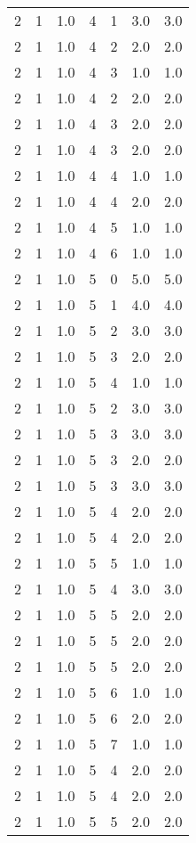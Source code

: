 \documentclass[a4paper,12pt]{article}
\begin{document}
\begin{center}
\begin{longtable}{ c c c | c c c | c }
        2 & 1 & 1.0 & 4 & 1 & 3.0 & 3.0 \\
        2 & 1 & 1.0 & 4 & 2 & 2.0 & 2.0 \\
        2 & 1 & 1.0 & 4 & 3 & 1.0 & 1.0 \\
        2 & 1 & 1.0 & 4 & 2 & 2.0 & 2.0 \\
        2 & 1 & 1.0 & 4 & 3 & 2.0 & 2.0 \\
        2 & 1 & 1.0 & 4 & 3 & 2.0 & 2.0 \\
        2 & 1 & 1.0 & 4 & 4 & 1.0 & 1.0 \\
        2 & 1 & 1.0 & 4 & 4 & 2.0 & 2.0 \\
        2 & 1 & 1.0 & 4 & 5 & 1.0 & 1.0 \\
        2 & 1 & 1.0 & 4 & 6 & 1.0 & 1.0 \\
        2 & 1 & 1.0 & 5 & 0 & 5.0 & 5.0 \\
        2 & 1 & 1.0 & 5 & 1 & 4.0 & 4.0 \\
        2 & 1 & 1.0 & 5 & 2 & 3.0 & 3.0 \\
        2 & 1 & 1.0 & 5 & 3 & 2.0 & 2.0 \\
        2 & 1 & 1.0 & 5 & 4 & 1.0 & 1.0 \\
        2 & 1 & 1.0 & 5 & 2 & 3.0 & 3.0 \\
        2 & 1 & 1.0 & 5 & 3 & 3.0 & 3.0 \\
        2 & 1 & 1.0 & 5 & 3 & 2.0 & 2.0 \\
        2 & 1 & 1.0 & 5 & 3 & 3.0 & 3.0 \\
        2 & 1 & 1.0 & 5 & 4 & 2.0 & 2.0 \\
        2 & 1 & 1.0 & 5 & 4 & 2.0 & 2.0 \\
        2 & 1 & 1.0 & 5 & 5 & 1.0 & 1.0 \\
        2 & 1 & 1.0 & 5 & 4 & 3.0 & 3.0 \\
        2 & 1 & 1.0 & 5 & 5 & 2.0 & 2.0 \\
        2 & 1 & 1.0 & 5 & 5 & 2.0 & 2.0 \\
        2 & 1 & 1.0 & 5 & 5 & 2.0 & 2.0 \\
        2 & 1 & 1.0 & 5 & 6 & 1.0 & 1.0 \\
        2 & 1 & 1.0 & 5 & 6 & 2.0 & 2.0 \\
        2 & 1 & 1.0 & 5 & 7 & 1.0 & 1.0 \\
        2 & 1 & 1.0 & 5 & 4 & 2.0 & 2.0 \\
        2 & 1 & 1.0 & 5 & 4 & 2.0 & 2.0 \\
        2 & 1 & 1.0 & 5 & 5 & 2.0 & 2.0 \\

\end{longtable}
\end{center}
\end{document}
